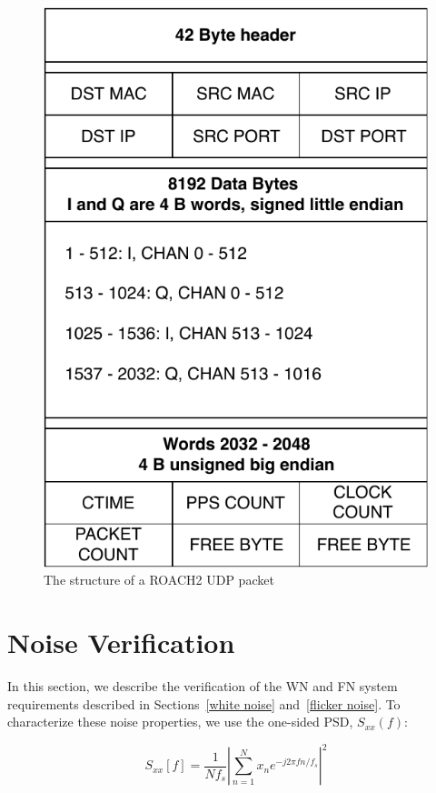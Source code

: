 \begin{figure}[!htbp]
\centering
\includegraphics[scale=0.75]{figures/readout/schematics/roach_packet}
\caption[~ROACH2 UDP packet structure.]{The structure of a ROACH2 UDP packet}
\label{fig:data packet}
\end{figure}

\section{Noise Verification}\label{noise verify}

In this section, we describe the verification of the WN and FN system requirements described in Sections~\ref{white noise} and~\ref{flicker noise}. To characterize these noise properties, we use the one-sided PSD, $S_{xx}(f)$:

\begin{equation}\label{eq:psd}
  S_{xx}[f]={\frac {1}{N f_{s}}}\left|\sum _{n=1}^{N}x_{n}e^{-j2\pi f n/f_{s}}\right|^{2}
\end{equation}

